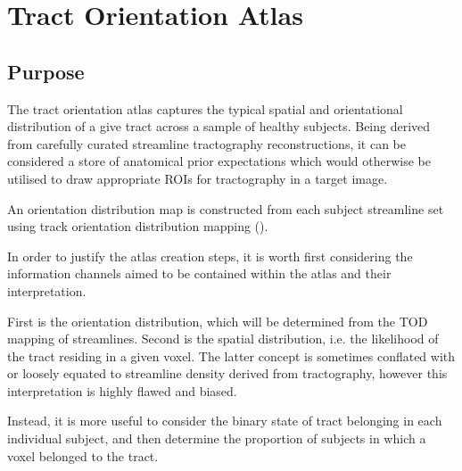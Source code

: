 \chapter{Tract Orientation Atlas}
\label{chapterlabel2}

\section{Purpose}

The tract orientation atlas captures the typical spatial and orientational distribution of a give tract across a sample of healthy subjects. Being derived from carefully curated streamline tractography reconstructions, it can be considered a store of anatomical prior expectations which would otherwise be utilised to draw appropriate ROIs for tractography in a target image.


An orientation distribution map is constructed from each subject streamline set using track orientation distribution mapping ().\autocite{Dhollander2014}

In order to justify the atlas creation steps, it is worth first considering the information channels aimed to be contained within the atlas and their interpretation.

First is the orientation distribution, which will be determined from the TOD mapping of streamlines.
Second is the spatial distribution, i.e. the likelihood of the tract residing in a given voxel.
The latter concept is sometimes conflated with or loosely equated to streamline density derived from tractography, however this interpretation is highly flawed and biased.

Instead, it is more useful to consider the binary state of tract belonging in each individual subject, and then determine the proportion of subjects in which a voxel belonged to the tract.

